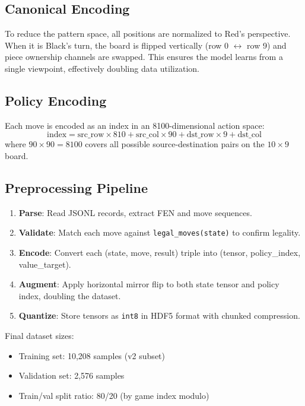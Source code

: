 \documentclass[a4paper,12pt]{article}
\begin{document}
\subsection{Canonical Encoding}

To reduce the pattern space, all positions are normalized to Red's perspective. When it is Black's turn, the board is flipped vertically (row 0 $\leftrightarrow$ row 9) and piece ownership channels are swapped. This ensures the model learns from a single viewpoint, effectively doubling data utilization.

\subsection{Policy Encoding}

Each move is encoded as an index in an 8100-dimensional action space:
\[
\text{index} = \text{src\_row} \times 810 + \text{src\_col} \times 90 + \text{dst\_row} \times 9 + \text{dst\_col}
\]
where $90 \times 90 = 8100$ covers all possible source-destination pairs on the $10 \times 9$ board.

\subsection{Preprocessing Pipeline}

\begin{enumerate}
    \item \textbf{Parse}: Read JSONL records, extract FEN and move sequences.
    \item \textbf{Validate}: Match each move against \texttt{legal\_moves(state)} to confirm legality.
    \item \textbf{Encode}: Convert each (state, move, result) triple into (tensor, policy\_index, value\_target).
    \item \textbf{Augment}: Apply horizontal mirror flip to both state tensor and policy index, doubling the dataset.
    \item \textbf{Quantize}: Store tensors as \texttt{int8} in HDF5 format with chunked compression.
\end{enumerate}

Final dataset sizes:
\begin{itemize}
    \item Training set: 10,208 samples (v2 subset)
    \item Validation set: 2,576 samples
    \item Train/val split ratio: 80/20 (by game index modulo)
\end{itemize}
\end{document}
